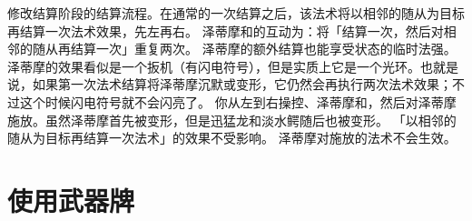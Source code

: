 修改结算阶段的结算流程。在通常的一次结算之后，该法术将以相邻的随从为目标再结算一次法术效果，先左再右。
\notice 泽蒂摩和的互动为：将「结算一次，然后对相邻的随从再结算一次」重复两次。
\notice 泽蒂摩的额外结算也能享受状态的临时法强。
\notice 泽蒂摩的效果看似是一个扳机（有闪电符号），但是实质上它是一个光环。也就是说，如果第一次法术结算将泽蒂摩沉默或变形，它仍然会再执行两次法术效果；不过这个时候闪电符号就不会闪亮了。
\example 你从左到右操控、泽蒂摩和，然后对泽蒂摩施放。虽然泽蒂摩首先被变形，但是迅猛龙和淡水鳄随后也被变形。
\notice 「以相邻的随从为目标再结算一次法术」的效果不受影响。
\notice 泽蒂摩对施放的法术不会生效。

\section{使用武器牌}

